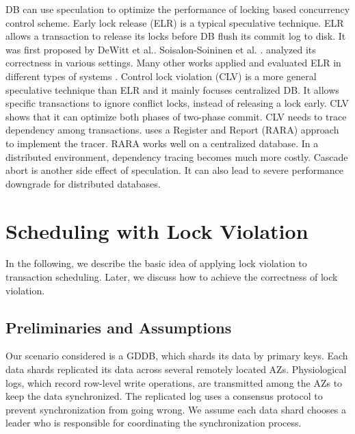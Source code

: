 \documentclass[conference]{IEEEtran}
\begin{document}
DB can use speculation to optimize the performance of locking based concurrency control scheme.
Early lock release (ELR)
\cite{EfficientLocking:conf/vldb/KimuraGK12}
\cite{ELR:dewitt_implementation_1984}
\cite{PS2PL:conf/icdt/Soisalon-SoininenY95}
\cite{Aether:journals/pvldb/JohnsonPSAA10}
\cite{Actor-Oriented-DB:conf/icde/Bernstein18}
is a typical speculative technique.
ELR allows a transaction to release its locks before DB flush its commit log to disk.
It was first proposed by DeWitt et al.\cite{ELR:dewitt_implementation_1984}.
Soisalon-Soininen et al. .\cite{PS2PL:conf/icdt/Soisalon-SoininenY95} analyzed its correctness in various settings.
Many other works applied and evaluated ELR in different types of systems 
\cite{EfficientLocking:conf/vldb/KimuraGK12}
\cite{Aether:journals/pvldb/JohnsonPSAA10}.
Control lock violation (CLV) \cite{CLV:conf/sigmod/GraefeLKTV13} is a more general speculative technique than ELR and it mainly focuses centralized DB.
It allows specific transactions to ignore conflict locks, instead of releasing a lock early.
CLV shows that it can optimize both phases of two-phase commit.
CLV needs to trace dependency among transactions.
\cite{CLV:conf/sigmod/GraefeLKTV13} uses a Register and Report (RARA) approach \cite{HeckatonMVCC:journals/pvldb/LarsonBDFPZ11} to implement the tracer.
RARA works well on a centralized database. In a distributed environment, dependency tracing becomes much more costly.
Cascade abort is another side effect of speculation. It can also lead to severe performance downgrade for distributed databases.


\section{Scheduling with Lock Violation}
\label{sec:non_strict}

In the following, we describe the basic idea of applying lock violation to transaction scheduling.
Later, we discuss how to achieve the correctness of lock violation.
\subsection{Preliminaries and Assumptions}
Our scenario considered is a GDDB, which shards its data by primary keys.
Each data shards replicated its data across several remotely located AZs.
Physiological logs, which record row-level write operations, are transmitted among the AZs to keep the data synchronized.
The replicated log uses a consensus protocol to prevent synchronization from going wrong.
We assume each data shard chooses a leader who is responsible for coordinating the synchronization process.
\end{document}
